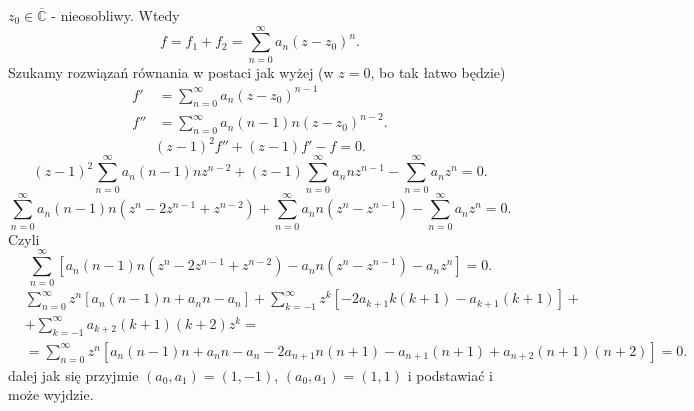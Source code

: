 \documentclass[../main.tex]{subfiles}
\begin{document}
$z_0\in \overline{\mathbb{C}}$ - nieosobliwy. Wtedy
\[
    f = f_1 + f_2 = \sum_{n=0}^{\infty} a_n\left( z-z_0 \right) ^n
.\]
Szukamy rozwiązań równania w postaci jak wyżej (w $z = 0$, bo tak łatwo będzie)
\begin{align*}
    f' &= \sum_{n=0}^{\infty} a_n\left( z-z_0 \right)^{n-1}\\
    f'' &= \sum_{n=0}^{\infty} a_n\left( n-1 \right)n \left( z-z_0 \right)^{n-2}
.\end{align*}
\[
    \left( z-1 \right) ^2 f'' + \left( z-1 \right) f' - f = 0
.\]
\[
    \left( z-1 \right) ^2 \sum_{n=0}^{\infty} a_n\left( n-1 \right) nz^{n-2} + \left( z-1 \right)\sum_{n=0}^{\infty} a_n n z^{n-1} - \sum_{n=0}^{\infty} a_nz^n = 0
.\]
\[
    \sum_{n=0}^{\infty} a_n(n-1)n(z^n - 2z^{n-1}+z^{n-2}) + \sum_{n=0}^{\infty} a_n n \left( z^n - z^{n-1} \right) - \sum_{n=0}^{\infty} a_nz^n = 0
.\]
Czyli
\[
    \sum_{n=0}^{\infty} \left[ a_n\left( n-1 \right) n \left( z^n - 2z^{n-1} + z^{n-2} \right) - a_n n \left( z^n - z^{n-1} \right) - a_nz^n \right] = 0
.\]
\begin{align*}
    &\sum_{n=0}^{\infty} z^n \left[ a_n \left( n-1 \right) n + a_n n - a_n \right] + \sum_{k = -1}^{\infty} z^k \left[ -2a_{k+1}k(k+1) - a_{k+1}(k+1) \right] +\\
    &+ \sum_{k = -1}^{\infty} a_{k+2}(k+1)(k+2)z^k =\\
    &= \sum_{n=0}^{\infty} z^n\left[ a_n(n-1)n + a_n n - a_n - 2a_{n+1}n(n+1) - a_{n+1}(n+1) + a_{n+2}(n+1)(n+2) \right] = 0
.\end{align*}
dalej jak się przyjmie $\left( a_0, a_1 \right) = (1,-1)$, $(a_0, a_1) = (1,1)$ i podstawiać i może wyjdzie.
\end{document}
